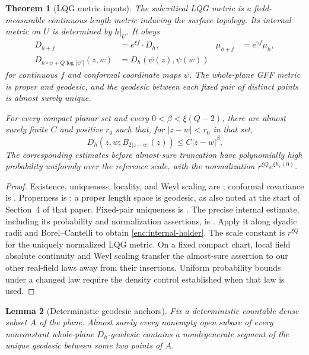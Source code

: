 \documentclass[11pt]{article}
\numberwithin{equation}{section}
\newtheorem{theorem}{Theorem}[section]
\newtheorem{lemma}[theorem]{Lemma}
\theoremstyle{definition}
\theoremstyle{remark}
\newcommand{\1}{\mathbf 1}
\begin{document}
\begin{theorem}[LQG metric inputs]\label{enc:lqg-metric}
The subcritical LQG metric is a field-measurable continuous length metric
inducing the surface topology.  Its internal metric on $U$ is determined
by $h|_U$.  It obeys
\begin{align}
 D_{h+f}&=e^{\xi f}\!\cdot D_h,
 &\mu_{h+f}&=e^{\gamma f}\mu_h,\label{enc:weyl}\\
 D_{h\circ\psi+Q\log|\psi'|}(z,w)
 &=D_h(\psi(z),\psi(w))\label{enc:covariance}
\end{align}
for continuous $f$ and conformal coordinate maps $\psi$.
The whole-plane GFF metric is proper and geodesic, and the geodesic
between each fixed pair of distinct points is almost surely unique.

For every compact planar set and every
$0<\beta<\xi(Q-2)$, there are almost surely finite $C$ and positive
$r_0$ such that, for $|z-w|<r_0$ in that set,
\begin{equation}\label{enc:internal-holder}
 D_h(z,w;B_{2|z-w|}(z))\le C|z-w|^\beta.
\end{equation}
The corresponding estimates before almost-sure truncation have
polynomially high probability uniformly over the reference scale, with
the normalization $r^{\xi Q}e^{\xi h_r(0)}$.
\end{theorem}

\begin{proof}
Existence, uniqueness, locality, and Weyl scaling are
\cite{GwynneMillerMetric}; conformal covariance is
\cite[Theorem 1.3]{GwynneMillerCovariance}.  Properness is \cite[Lemma~3.8]{DubedatEtAlWeakMetric}; a proper
length space is geodesic, as also noted at the start of Section~4
of that paper.
Fixed-pair uniqueness is \cite[Theorem 1.2]{MillerQianGeodesics}.
The precise internal estimate, including its probability and
normalization assertions, is
\cite[Lemma 3.20, equations (3.66)--(3.67)]{DubedatEtAlWeakMetric}.
Apply it along dyadic radii and Borel--Cantelli to obtain
\eqref{enc:internal-holder}.  The scale constant is
$r^{\xi Q}$ for the uniquely normalized LQG metric.  On a fixed compact
chart, local field absolute continuity and Weyl scaling transfer the
almost-sure assertion to our other real-field laws away from their
insertions.  Uniform probability bounds under a changed law require
the density control established when that law is used.
\end{proof}

\begin{lemma}[Deterministic geodesic anchors]\label{enc:geodesic-anchors}
Fix a deterministic countable dense subset $A$ of the plane.  Almost
surely every nonempty open subarc of every nonconstant whole-plane
$D_h$-geodesic contains a nondegenerate segment of the unique geodesic
between some two points of $A$.
\end{lemma}
\end{document}
